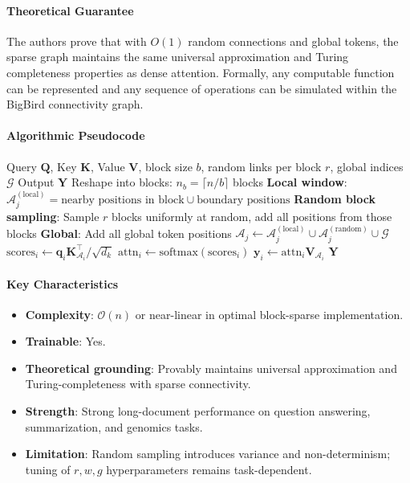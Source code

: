 \paragraph{Theoretical Guarantee}

The authors prove that with $O(1)$ random connections and global tokens, the sparse graph maintains the same universal approximation and Turing completeness properties as dense attention. Formally, any computable function can be represented and any sequence of operations can be simulated within the BigBird connectivity graph.

\paragraph{Algorithmic Pseudocode}

\begin{algorithm}[H]
\caption{BigBird: Random + Local + Global Block-Sparse Attention}
\begin{algorithmic}[1]
\Require Query $\mathbf{Q}$, Key $\mathbf{K}$, Value $\mathbf{V}$, block size $b$, random links per block $r$, global indices $\mathcal{G}$
\Ensure Output $\mathbf{Y}$
\State Reshape into blocks: $n_b = \lceil n / b \rceil$ blocks
        \State \textbf{Local window}: $\mathcal{A}_j^{(\text{local})} = \text{nearby positions in block} \cup \text{boundary positions}$
        \State \textbf{Random block sampling}: Sample $r$ blocks uniformly at random, add all positions from those blocks
        \State \textbf{Global}: Add all global token positions
        \State $\mathcal{A}_j \gets \mathcal{A}_j^{(\text{local})} \cup \mathcal{A}_j^{(\text{random})} \cup \mathcal{G}$
    \EndFor
\EndFor
{}
    \State $\text{scores}_i \gets \mathbf{q}_i \mathbf{K}_{\mathcal{A}_i}^\top / \sqrt{d_k}$
    \State $\text{attn}_i \gets \text{softmax}(\text{scores}_i)$
    \State $\mathbf{y}_i \gets \text{attn}_i \mathbf{V}_{\mathcal{A}_i}$
\EndFor
\Return $\mathbf{Y}$
\end{algorithmic}
\end{algorithm}

\paragraph{Key Characteristics}

\begin{itemize}[leftmargin=*]
    \item \textbf{Complexity}: $\mathcal{O}(n)$ or near-linear in optimal block-sparse implementation.
    \item \textbf{Trainable}: Yes.
    \item \textbf{Theoretical grounding}: Provably maintains universal approximation and Turing-completeness with sparse connectivity.
    \item \textbf{Strength}: Strong long-document performance on question answering, summarization, and genomics tasks.
    \item \textbf{Limitation}: Random sampling introduces variance and non-determinism; tuning of $r, w, g$ hyperparameters remains task-dependent.
\end{itemize}


